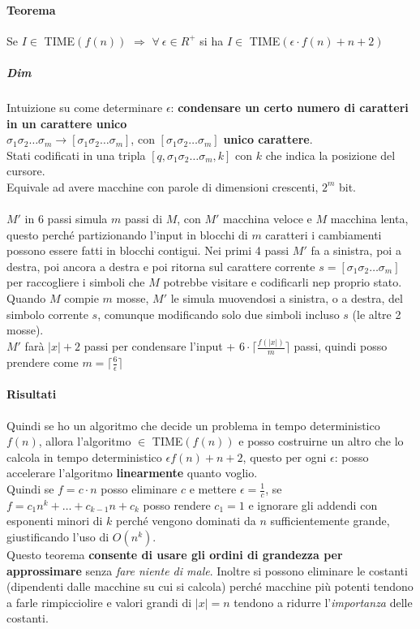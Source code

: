 \documentclass[10pt]{book}
\begin{document}
\paragraph{Teorema} Se $I \in$ TIME$(f(n))$ $\Rightarrow$ $\forall\: \epsilon \in R^+$ si ha $I\in$ TIME$(\epsilon\cdot f(n) + n + 2)$
\subparagraph{Dim} Intuizione su come determinare $\epsilon$:  \textbf{condensare un certo numero di caratteri in un carattere unico}\\
	$\sigma_1 \sigma_2 \ldots \sigma_m \longrightarrow [\sigma_1 \sigma_2 \ldots \sigma_m]$, con $[\sigma_1 \sigma_2 \ldots \sigma_m]$ \textbf{unico carattere}.\\
	Stati codificati in una tripla $[q, \sigma_1 \sigma_2 \ldots \sigma_m, k]$ con $k$ che indica la posizione del cursore.\\
	Equivale ad avere macchine con parole di dimensioni crescenti, $2^m$ bit.\\\\
$M'$ in 6 passi simula $m$ passi di $M$, con $M'$ macchina veloce e $M$ macchina lenta, questo perché partizionando l'input in blocchi di $m$ caratteri i cambiamenti possono essere fatti in blocchi contigui. Nei primi 4 passi $M'$ fa a sinistra, poi a destra, poi ancora a destra e poi ritorna sul carattere corrente $s = [\sigma_1\sigma_2\ldots\sigma_m]$ per raccogliere i simboli che $M$ potrebbe visitare e codificarli nep proprio stato. Quando $M$ compie $m$ mosse, $M'$ le simula muovendosi a sinistra, o a destra, del simbolo corrente $s$, comunque modificando solo due simboli incluso $s$ (le altre 2 mosse).\\
$M'$ farà $|x|+2$ passi per condensare l'input + $6\cdot \lceil \frac{f(|x|)}{m} \rceil$ passi, quindi posso prendere come $m = \lceil \frac{6}{\epsilon} \rceil$
\paragraph{Risultati} Quindi se ho un algoritmo che decide un problema in tempo deterministico $f(n)$, allora l'algoritmo $\in$ TIME$(f(n))$ e posso costruirne un altro che lo calcola in tempo deterministico $\epsilon f(n) + n + 2$, questo per ogni $\epsilon$: posso accelerare l'algoritmo \textbf{linearmente} quanto voglio.\\
Quindi se $f = c\cdot n$ posso eliminare $c$ e mettere $\epsilon = \frac{1}{c}$, se $f = c_1n^k + \ldots + c_{k-1}n + c_k$ posso rendere $c_1 = 1$ e ignorare gli addendi con esponenti minori di $k$ perché vengono dominati da $n$ sufficientemente grande, giustificando l'uso di $O(n^k)$.\\
Questo teorema \textbf{consente di usare gli ordini di grandezza per approssimare} senza \textit{fare niente di male}. Inoltre si possono eliminare le costanti (dipendenti dalle macchine su cui si calcola) perché macchine più potenti tendono a farle rimpicciolire e valori grandi di $|x| = n$ tendono a ridurre l'\textit{importanza} delle costanti.
\end{document}
